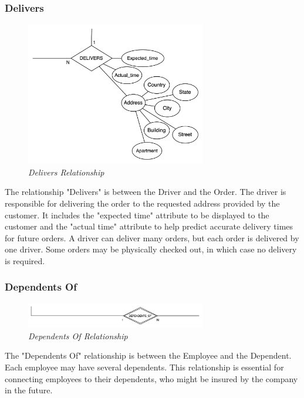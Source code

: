 \subsubsection{Delivers}
\begin{figure}[H]
  \centering
  \includegraphics[width=0.7\textwidth]{images/relationships/delivers.png}
  \caption{\textit{Delivers Relationship}}
\end{figure}

The relationship "Delivers" is between the Driver and the Order. The driver is responsible for delivering the order to the requested address provided by the customer. It includes the "expected time" attribute to be displayed to the customer and the "actual time" attribute to help predict accurate delivery times for future orders. A driver can deliver many orders, but each order is delivered by one driver. Some orders may be physically checked out, in which case no delivery is required.

\subsubsection{Dependents Of}
\begin{figure}[H]
  \centering
  \includegraphics[width=0.7\textwidth]{images/relationships/dependents_of.png}
  \caption{\textit{Dependents Of Relationship}}
\end{figure}

The "Dependents Of" relationship is between the Employee and the Dependent. Each employee may have several dependents. This relationship is essential for connecting employees to their dependents, who might be insured by the company in the future.

